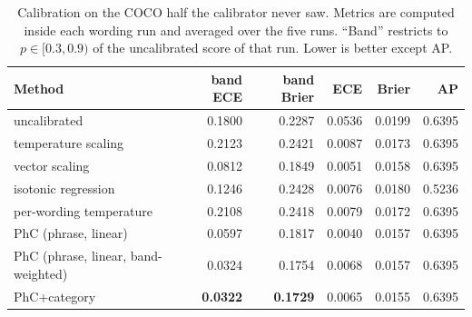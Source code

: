 \begin{table}[t]
\caption{Calibration on the COCO half the calibrator never saw. Metrics are computed inside each wording run and averaged over the five runs. ``Band'' restricts to $p\in[0.3,0.9)$ of the uncalibrated score of that run. Lower is better except AP.}
\label{tab:main}
\begin{tabular*}{\textwidth}{@{\extracolsep{\fill}}lrrrrr@{}}
\toprule
Method & band ECE & band Brier & ECE & Brier & AP \\
\midrule
uncalibrated                       & 0.1800 & 0.2287 & 0.0536 & 0.0199 & 0.6395 \\
temperature scaling                & 0.2123 & 0.2421 & 0.0087 & 0.0173 & 0.6395 \\
vector scaling                     & 0.0812 & 0.1849 & 0.0051 & 0.0158 & 0.6395 \\
isotonic regression                & 0.1246 & 0.2428 & 0.0076 & 0.0180 & 0.5236 \\
per-wording temperature            & 0.2108 & 0.2418 & 0.0079 & 0.0172 & 0.6395 \\
PhC (phrase, linear)               & 0.0597 & 0.1817 & 0.0040 & 0.0157 & 0.6395 \\
PhC (phrase, linear, band-weighted) & 0.0324 & 0.1754 & 0.0068 & 0.0157 & 0.6395 \\
PhC+category                       & \textbf{0.0322} & \textbf{0.1729} & 0.0065 & 0.0155 & 0.6395 \\
\bottomrule
\end{tabular*}
\end{table}
